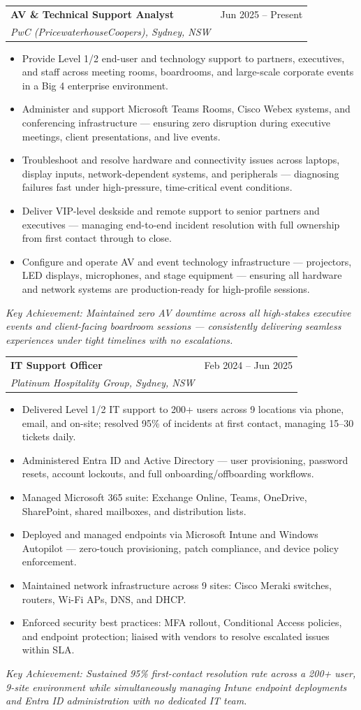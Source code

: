 \documentclass[letterpaper,11pt]{article}
\makeatletter
\newcommand{\resumeItem}[1]{
  \item\small{#1 \vspace{-2pt}}
}
\newcommand{\resumeSubheading}[4]{
  \vspace{-2pt}\item
    \begin{tabular*}{0.97\textwidth}[t]{l@{\extracolsep{\fill}}r}
      \textbf{#1} & #2 \\
      \textit{\small#3} & \textit{\small #4} \\
    \end{tabular*}\vspace{-7pt}
}
\newcommand{\resumeItemListStart}{\begin{itemize}}
\newcommand{\resumeItemListEnd}{\end{itemize}\vspace{-5pt}}
\makeatother
\begin{document}
    \resumeSubheading
      {AV \& Technical Support Analyst}{Jun 2025 -- Present}
      {PwC (PricewaterhouseCoopers), Sydney, NSW}{}
      \resumeItemListStart
        \resumeItem{Provide Level 1/2 end-user and technology support to partners, executives, and staff across meeting rooms, boardrooms, and large-scale corporate events in a Big 4 enterprise environment.}
        \resumeItem{Administer and support Microsoft Teams Rooms, Cisco Webex systems, and conferencing infrastructure --- ensuring zero disruption during executive meetings, client presentations, and live events.}
        \resumeItem{Troubleshoot and resolve hardware and connectivity issues across laptops, display inputs, network-dependent systems, and peripherals --- diagnosing failures fast under high-pressure, time-critical event conditions.}
        \resumeItem{Deliver VIP-level deskside and remote support to senior partners and executives --- managing end-to-end incident resolution with full ownership from first contact through to close.}
        \resumeItem{Configure and operate AV and event technology infrastructure --- projectors, LED displays, microphones, and stage equipment --- ensuring all hardware and network systems are production-ready for high-profile sessions.}
      \resumeItemListEnd
      \vspace{2pt}
      \small\textit{Key Achievement: Maintained zero AV downtime across all high-stakes executive events and client-facing boardroom sessions --- consistently delivering seamless experiences under tight timelines with no escalations.}

    \vspace{4pt}
    \resumeSubheading
      {IT Support Officer}{Feb 2024 -- Jun 2025}
      {Platinum Hospitality Group, Sydney, NSW}{}
      \resumeItemListStart
        \resumeItem{Delivered Level 1/2 IT support to 200+ users across 9 locations via phone, email, and on-site; resolved 95\% of incidents at first contact, managing 15--30 tickets daily.}
        \resumeItem{Administered Entra ID and Active Directory --- user provisioning, password resets, account lockouts, and full onboarding/offboarding workflows.}
        \resumeItem{Managed Microsoft 365 suite: Exchange Online, Teams, OneDrive, SharePoint, shared mailboxes, and distribution lists.}
        \resumeItem{Deployed and managed endpoints via Microsoft Intune and Windows Autopilot --- zero-touch provisioning, patch compliance, and device policy enforcement.}
        \resumeItem{Maintained network infrastructure across 9 sites: Cisco Meraki switches, routers, Wi-Fi APs, DNS, and DHCP.}
        \resumeItem{Enforced security best practices: MFA rollout, Conditional Access policies, and endpoint protection; liaised with vendors to resolve escalated issues within SLA.}
      \resumeItemListEnd
      \vspace{2pt}
      \small\textit{Key Achievement: Sustained 95\% first-contact resolution rate across a 200+ user, 9-site environment while simultaneously managing Intune endpoint deployments and Entra ID administration with no dedicated IT team.}
\end{document}
